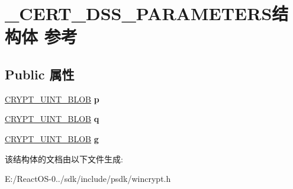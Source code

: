 \hypertarget{struct___c_e_r_t___d_s_s___p_a_r_a_m_e_t_e_r_s}{}\section{\+\_\+\+C\+E\+R\+T\+\_\+\+D\+S\+S\+\_\+\+P\+A\+R\+A\+M\+E\+T\+E\+R\+S结构体 参考}
\label{struct___c_e_r_t___d_s_s___p_a_r_a_m_e_t_e_r_s}
\subsection*{Public 属性}
\begin{DoxyCompactItemize}
\item 
\mbox{\label{struct___c_e_r_t___d_s_s___p_a_r_a_m_e_t_e_r_s_a6526dc8bd2d47c986e6c581a0c69222b}} 
\hyperlink{struct___c_r_y_p_t_o_a_p_i___b_l_o_b}{C\+R\+Y\+P\+T\+\_\+\+U\+I\+N\+T\+\_\+\+B\+L\+OB} {\bfseries p}
\item 
\mbox{\label{struct___c_e_r_t___d_s_s___p_a_r_a_m_e_t_e_r_s_aac585f99677d393002dd1147663e875c}} 
\hyperlink{struct___c_r_y_p_t_o_a_p_i___b_l_o_b}{C\+R\+Y\+P\+T\+\_\+\+U\+I\+N\+T\+\_\+\+B\+L\+OB} {\bfseries q}
\item 
\mbox{\label{struct___c_e_r_t___d_s_s___p_a_r_a_m_e_t_e_r_s_abc0f30808a228f415895e08678051106}} 
\hyperlink{struct___c_r_y_p_t_o_a_p_i___b_l_o_b}{C\+R\+Y\+P\+T\+\_\+\+U\+I\+N\+T\+\_\+\+B\+L\+OB} {\bfseries g}
\end{DoxyCompactItemize}


该结构体的文档由以下文件生成\+:\begin{DoxyCompactItemize}
\item 
E\+:/\+React\+O\+S-\/0../sdk/include/psdk/wincrypt.\+h\end{DoxyCompactItemize}
